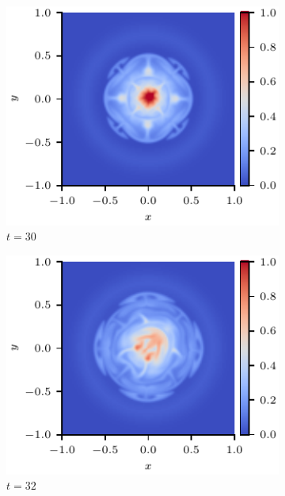 \documentclass[12pt]{article}
\begin{document}
\begin{figure}[t]
\begin{subfigure}{0.32\textwidth}
      \includegraphics[width=\linewidth]{swi-3_pressure_15.pdf}
      \caption{$t=30$}
      \label{fig:swi-3_pressure_15}
    \end{subfigure}
    \hfill
    \begin{subfigure}{0.32\textwidth}
      \includegraphics[width=\linewidth]{swi-3_pressure_16.pdf}
      \caption{$t=32$}
      \label{fig:swi-3_pressure_16}
    \end{subfigure}
    \hfill
    \begin{subfigure}{0.32\textwidth}

\end{subfigure}
\end{figure}
\end{document}
